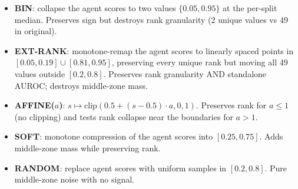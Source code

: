 \begin{itemize}
    \item \textbf{BIN}: collapse the agent scores to two values $\{0.05, 0.95\}$ at the per-split median. Preserves sign but destroys rank granularity (2 unique values vs 49 in original).
    \item \textbf{EXT-RANK}: monotone-remap the agent scores to linearly spaced points in $[0.05, 0.19]\cup[0.81, 0.95]$, preserving every unique rank but moving all 49 values outside $[0.2, 0.8]$. Preserves rank granularity AND standalone AUROC; destroys middle-zone mass.
    \item \textbf{AFFINE($a$)}: $s\mapsto\mathrm{clip}(0.5 + (s-0.5)\cdot a, 0, 1)$. Preserves rank for $a\!\le\!1$ (no clipping) and tests rank collapse near the boundaries for $a\!>\!1$.
    \item \textbf{SOFT}: monotone compression of the agent scores into $[0.25, 0.75]$. Adds middle-zone mass while preserving rank.
    \item \textbf{RANDOM}: replace agent scores with uniform samples in $[0.2, 0.8]$. Pure middle-zone noise with no signal.
\end{itemize}

